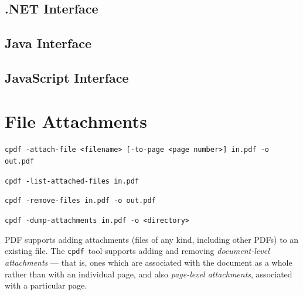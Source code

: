 \documentclass{book}
\newcommand{\cpdf}{\texttt{cpdf}}
\begin{document}
\begin{dotnetcpdflib}
\clearpage
\section*{.NET Interface}
\begin{small}\tt

\end{small}
\end{dotnetcpdflib}

\begin{jcpdflib}
\clearpage
\section*{Java Interface}
\begin{small}\tt

\end{small}
\end{jcpdflib}

\begin{jscpdflib}
\clearpage
\section*{JavaScript Interface}
\begin{small}\tt

\end{small}
\end{jscpdflib}

\chapter{File Attachments}\label{chap:12}\pagestyle{fancy}
\begin{framed}
  \small\noindent\verb!cpdf -attach-file <filename> [-to-page <page number>] in.pdf -o out.pdf!

  \vspace{1.5mm}
  \small\noindent\verb!cpdf -list-attached-files in.pdf!
 
  \vspace{1.5mm}
  \small\noindent\verb!cpdf -remove-files in.pdf -o out.pdf!

  \vspace{1.5mm}
  \small\noindent\verb!cpdf -dump-attachments in.pdf -o <directory>!
\end{framed}
  PDF supports adding attachments (files of any kind, including other PDFs) to
an existing file. The \cpdf\ tool supports adding and removing \textit{document-level
attachments} --- that is, ones which are associated with the document as a
whole rather than with an individual page, and also \textit{page-level attachments}, associated with a particular page.
\end{document}
